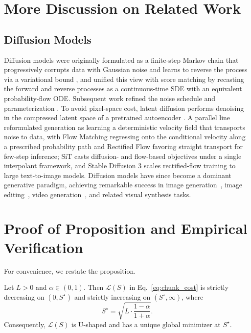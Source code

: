 \documentclass{llmxive}
\providecommand{\theHproposition}{appendix.\arabic{proposition}}
\begin{document}
\section{More Discussion on Related Work}
\label{app:relatedworks}

\subsection{Diffusion Models}

Diffusion models were originally formulated as a finite-step Markov chain that progressively corrupts data with Gaussian noise and learns to reverse the process via a variational bound \citep{sohl2015deep,ho2020denoising}, and \citet{song2020score} unified this view with score matching by recasting the forward and reverse processes as a continuous-time SDE with an equivalent probability-flow ODE. Subsequent work refined the noise schedule and parameterization \citep{nichol2021improved,kingma2021variational,karras2022elucidating, song2020denoising}. To avoid pixel-space cost, latent diffusion performs denoising in the compressed latent space of a pretrained autoencoder \citep{rombach2022high}. A parallel line reformulated generation as learning a deterministic velocity field that transports noise to data, with Flow Matching \citep{lipman2022flow} regressing onto the conditional velocity along a prescribed probability path and Rectified Flow \citep{liu2022flow} favoring straight transport for few-step inference; SiT \citep{ma2024sit} casts diffusion- and flow-based objectives under a single interpolant framework, and Stable Diffusion 3 \citep{esser2024scaling} scales rectified-flow training to large text-to-image models. Diffusion models have since become a dominant generative paradigm, achieving remarkable success in image generation~\citep{wu2025qwen, xie2024sana, flux2024}, image editing~\citep{labs2025flux, ci2025describe, zhang2025test}, video generation~\citep{yang2024cogvideox, wan2025wan}, and related visual synthesis tasks.

\section{Proof of Proposition and Empirical Verification}
\label{app:chunk_proof}

For convenience, we restate the proposition.
\setcounter{proposition}{0}
\renewcommand{\theHproposition}{appendix.\arabic{proposition}}
\begin{proposition}
Let $L>0$ and $\alpha\in(0,1)$. Then $\mathcal{L}(S)$ in
Eq.~\eqref{eq:chunk_cost} is strictly decreasing on $(0,S^\star)$ and strictly
increasing on $(S^\star,\infty)$, where
\begin{equation}
S^\star=\sqrt{L \cdot \frac{1-\alpha}{1+\alpha}}.
\end{equation}
Consequently, $\mathcal{L}(S)$ is U-shaped and has a unique global minimizer at
$S^\star$.
\end{proposition}
\end{document}
